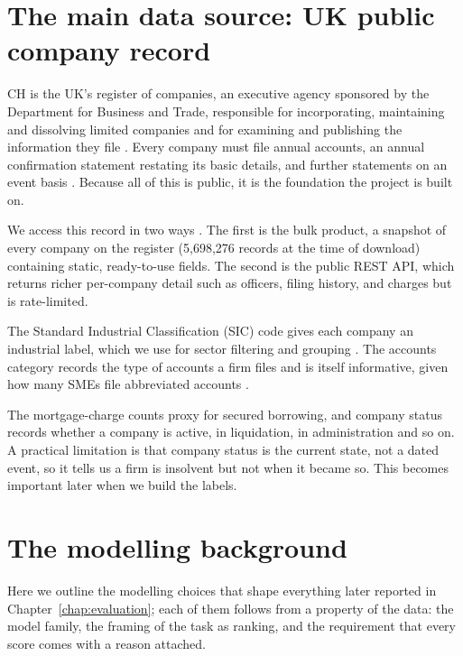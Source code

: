 \documentclass[    author={Samuel Menon Demelo; Sneha Saphala Ram Prasad; 
Viktor Ander Lindholm; Vishal Khatri},
               supervisor={Prof. Fernando Moreno-Pino},
                   degree={MSc},
                    title={Lloyds Commercial Banking Intelligence},
                 subtitle={Ranking SME Lending, Risk and Growth Prospects for Lloyds Banking Group},
                     type={},
                     year={2026}]{dissertation}
\begin{document}
\section{The main data source: UK public company record}
CH is the UK's register of companies, an executive agency sponsored by the Department for Business and Trade, responsible for incorporating, maintaining and dissolving limited companies and for examining and publishing the information they file \cite{companieshouse_api}. Every company must file annual accounts, an annual confirmation statement restating its basic details, and further statements on an event basis \cite{companieshouse_accounts_2026}. Because all of this is public, it is the foundation the project is built on.

We access this record in two ways \cite{companieshouse_api}. The first is the bulk product, a snapshot of every company on the register (5,698,276 records at the time of download) containing static, ready-to-use fields. The second is the public REST API, which returns richer per-company detail such as officers, filing history, and charges but is rate-limited.

The Standard Industrial Classification (SIC) code gives each company an industrial label, which we use for sector filtering and grouping \cite{companieshouse_sic}. The accounts category records the type of accounts a firm files and is itself informative, given how many SMEs file abbreviated accounts \cite{companieshouse_accounts_2026}. 

The mortgage-charge counts proxy for secured borrowing, and company status records whether a company is active, in liquidation, in administration and so on. A practical limitation is that company status is the current state, not a dated event, so it tells us a firm is insolvent but not when it became so. This becomes important later when we build the labels.

\section{The modelling background}
\label{sec:modelling-backgroud}
Here we outline the modelling choices that shape everything later reported in Chapter~\ref{chap:evaluation}; each of them follows from a property of the data: the model family, the framing of the task as ranking, and the requirement that every score comes with a reason attached.
\end{document}
